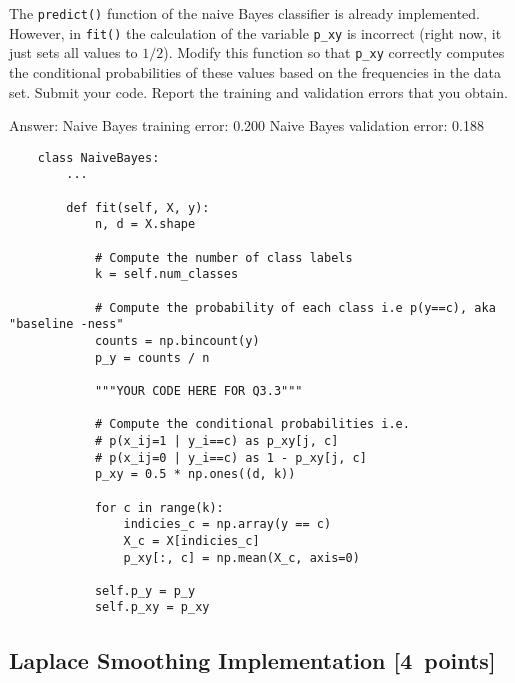 \documentclass{article}
\newcommand{\blu}[1]{{\textcolor{blu}{#1}}}
\newcommand{\gre}[1]{\textcolor{gre}{#1}}
\newcommand\ans[1]{\par\gre{Answer: #1}}
\let\ask\blu
\newcommand\pts[1]{\textcolor{pointscolour}{[#1~points]}}
\begin{document}
    The \texttt{predict()} function of the naive Bayes classifier is already implemented.
    However, in \texttt{fit()}
    the calculation of the variable \texttt{p\_xy} is incorrect
    (right now, it just sets all values to $1/2$).
    \ask{Modify this function so that \texttt{p\_xy} correctly
        computes the conditional probabilities of these values based on the
        frequencies in the data set. Submit your code. Report the training and validation errors that you obtain.}
    \ans{\newline Naive Bayes training error: 0.200 \newline Naive Bayes validation error: 0.188}
    \begin{verbatim}
    class NaiveBayes:
        ...
    
        def fit(self, X, y):
            n, d = X.shape
    
            # Compute the number of class labels
            k = self.num_classes
    
            # Compute the probability of each class i.e p(y==c), aka "baseline -ness"
            counts = np.bincount(y)
            p_y = counts / n
    
            """YOUR CODE HERE FOR Q3.3"""
    
            # Compute the conditional probabilities i.e.
            # p(x_ij=1 | y_i==c) as p_xy[j, c]
            # p(x_ij=0 | y_i==c) as 1 - p_xy[j, c]
            p_xy = 0.5 * np.ones((d, k))
    
            for c in range(k):
                indicies_c = np.array(y == c)
                X_c = X[indicies_c] 
                p_xy[:, c] = np.mean(X_c, axis=0) 
    
            self.p_y = p_y
            self.p_xy = p_xy
    \end{verbatim}
    

    \clearpage
    \subsection{Laplace Smoothing Implementation \pts{4}}
\end{document}
